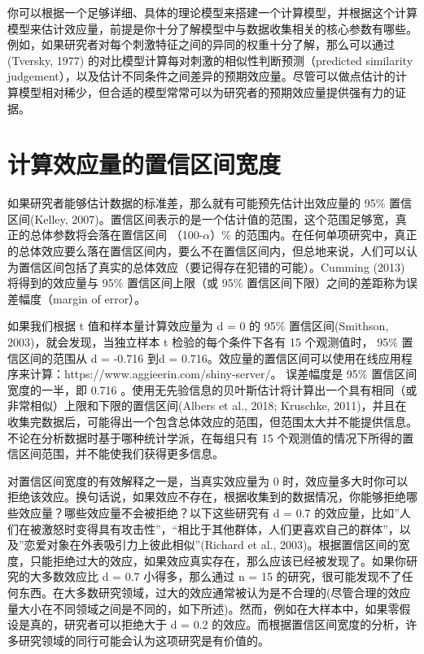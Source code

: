 \documentclass[
  letterpaper,
  DIV=11,
  numbers=noendperiod]{scrreprt}
\begin{document}
你可以根据一个足够详细、具体的理论模型来搭建一个计算模型，并根据这个计算模型来估计效应量，前提是你十分了解模型中与数据收集相关的核心参数有哪些。例如，如果研究者对每个刺激特征之间的异同的权重十分了解，那么可以通过(Tversky,
1977) 的对比模型计算每对刺激的相似性判断预测（predicted similarity
judgement），以及估计不同条件之间差异的预期效应量。尽管可以做点估计的计算模型相对稀少，但合适的模型常常可以为研究者的预期效应量提供强有力的证据。

\hypertarget{ux8ba1ux7b97ux6548ux5e94ux91cfux7684ux7f6eux4fe1ux533aux95f4ux5bbdux5ea6}{%
\section{计算效应量的置信区间宽度}\label{ux8ba1ux7b97ux6548ux5e94ux91cfux7684ux7f6eux4fe1ux533aux95f4ux5bbdux5ea6}}

如果研究者能够估计数据的标准差，那么就有可能预先估计出效应量的 95\%
置信区间(Kelley,
2007)。置信区间表示的是一个估计值的范围，这个范围足够宽，真正的总体参数将会落在置信区间
（100-\(\alpha\)）\%
的范围内。在任何单项研究中，真正的总体效应要么落在置信区间内，要么不在置信区间内，但总地来说，人们可以认为置信区间包括了真实的总体效应（要记得存在犯错的可能）。Cumming
(2013) 将得到的效应量与 95\% 置信区间上限（或 95\%
置信区间下限）之间的差距称为误差幅度（margin of error）。

如果我们根据 t 值和样本量计算效应量为 d = 0 的 95\% 置信区间(Smithson,
2003)，就会发现，当独立样本 t 检验的每个条件下各有 15 个观测值时， 95\%
置信区间的范围从 d = -0.716 到d =
0.716。效应量的置信区间可以使用在线应用程序来计算：https://www.aggieerin.com/shiny-server/。
误差幅度是 95\% 置信区间宽度的一半，即 0.716
。使用无先验信息的贝叶斯估计将计算出一个具有相同（或非常相似）上限和下限的置信区间(Albers
et al., 2018; Kruschke,
2011)，并且在收集完数据后，可能得出一个包含总体效应的范围，但范围太大并不能提供信息。不论在分析数据时基于哪种统计学派，在每组只有
15 个观测值的情况下所得的置信区间范围，并不能使我们获得更多信息。

对置信区间宽度的有效解释之一是，当真实效应量为 0
时，效应量多大时你可以拒绝该效应。换句话说，如果效应不存在，根据收集到的数据情况，你能够拒绝哪些效应量？哪些效应量不会被拒绝？以下这些研究有
d = 0.7
的效应量，比如''人们在被激怒时变得具有攻击性''，``相比于其他群体，人们更喜欢自己的群体''，以及''恋爱对象在外表吸引力上彼此相似''(Richard
et al.,
2003)。根据置信区间的宽度，只能拒绝过大的效应，如果效应真实存在，那么应该已经被发现了。如果你研究的大多数效应比
d = 0.7 小得多，那么通过 n = 15
的研究，很可能发现不了任何东西。在大多数研究领域，过大的效应通常被认为是不合理的(尽管合理的效应量大小在不同领域之间是不同的，如下所述)。然而，例如在大样本中，如果零假设是真的，研究者可以拒绝大于
d = 0.2
的效应。而根据置信区间宽度的分析，许多研究领域的同行可能会认为这项研究是有价值的。
\end{document}
